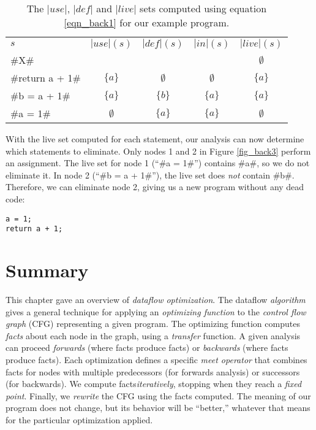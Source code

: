\documentclass[12pt]{report}
\begin{document}
\begin{table}
  \centering
  \begin{tabular}{lcccc}
    $s$ & $|use|(s)$ & $|def|(s)$ & $|in|(s)$ &  $|live|(s)$ \\
    \cmidrule(r){1-1}\cmidrule(r){2-2}\cmidrule(r){3-3}\cmidrule(r){4-4}\cmidrule(r){5-5}
    #X# & & & & $\emptyset$ \\
    #return a + 1# & $\{a\}$ & $\emptyset$ & $\emptyset$ & $\{a\}$ \\
    #b = a + 1# & $\{a\}$ & $\{b\}$ & $\{a\}$ & $\{a\}$ \\
    #a = 1# & $\emptyset$ & $\{a\}$ & $\{a\}$ & $\emptyset$ \\
    \bottomrule
  \end{tabular}
  \caption{The $|use|$, $|def|$ and $|live|$ sets computed using equation \ref{eqn_back1} for our example program.}
  \label{tbl_back1}
\end{table}

With the live set computed for each statement, our analysis can now
determine which statements to eliminate. Only nodes 1 and 2 in Figure
\ref{fig_back3} perform an assignment. The live set for node 1 (``#a = 1#'')
contains #a#, so we do not eliminate it. In node 2 (``#b = a + 1#''),
the live set does \emph{not} contain #b#. Therefore, we can eliminate
node 2, giving us a new program without any dead code:

\begin{Verbatim}
a = 1;
return a + 1;
\end{Verbatim}

\section{Summary}
\label{sec_back9}

This chapter gave an overview of \emph{dataflow optimization}. The
dataflow \emph{algorithm} gives a general technique for applying an
\emph{optimizing function} to the \emph{control flow graph} (CFG)
representing a given program. The optimizing function computes
\emph{facts} about each node in the graph, using a \emph{transfer}
function. A given analysis can proceed \emph{forwards} (where \inE
facts produce \out facts) or \emph{backwards} (where \out facts
produce \inE facts). Each optimization defines a specific \emph{meet
  operator} that combines facts for nodes with multiple predecessors
(for forwards analysis) or successors (for backwards). We compute
facts\emph{iteratively}, stopping when they reach a \emph{fixed
  point}. Finally, we \emph{rewrite} the CFG using the facts computed. The 
meaning of our program does not change, but its behavior will be ``better,'' 
whatever that means for the particular optimization applied.
\end{document}
